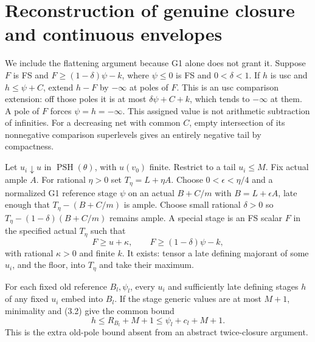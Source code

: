 \documentclass[10pt]{article}
\newcommand{\PSH}{\operatorname{PSH}}
\begin{document}
\section{Reconstruction of genuine closure and continuous envelopes}
We include the flattening argument because G1 alone does not grant it.
Suppose $F$ is FS and $F\geq(1-\delta)\psi-k$, where $\psi\leq0$ is FS
and $0<\delta<1$. If $h$ is usc and $h\leq\psi+C$, extend $h-F$ by
$-\infty$ at poles of $F$. This is an usc comparison extension:
off those poles it is at most $\delta\psi+C+k$, which tends to
$-\infty$ at them. A pole of $F$ forces $\psi=h=-\infty$.
This assigned value is not arithmetic subtraction of infinities.
For a decreasing net with common $C$, empty intersection of its
nonnegative comparison superlevels gives an entirely negative tail by
compactness.

Let $u_i\downarrow u$ in $\PSH(\theta)$, with $u(v_0)$ finite. Restrict
to a tail $u_i\leq M$. Fix actual ample $A$. For rational $\eta>0$ set
$T_\eta=L+\eta A$. Choose $0<\epsilon<\eta/4$ and a normalized G1
reference stage $\psi$ on an actual $B+C/m$ with $B=L+\epsilon A$, late
enough that $T_\eta-(B+C/m)$ is ample. Choose small rational $\delta>0$
so $T_\eta-(1-\delta)(B+C/m)$ remains ample. A special stage is an FS
scalar $F$ in the specified actual $T_\eta$ such that
\[
 F\geq u+\kappa,\qquad F\geq(1-\delta)\psi-k,
\tag{4.1}
\]
with rational $\kappa>0$ and finite $k$. It exists: tensor a late defining
majorant of some $u_i$, and the floor, into $T_\eta$ and take their maximum.

For each fixed old reference $B_l,\psi_l$, every $u_i$ and sufficiently
late defining stages $h$ of any fixed $u_i$ embed into $B_l$. If the
stage generic values are at most $M+1$, minimality and (3.2) give the
common bound
\[
 h\leq R_{B_l}+M+1\leq\psi_l+c_l+M+1.
\tag{4.2}
\]
This is the extra old-pole bound absent from an abstract twice-closure
argument.
\end{document}
